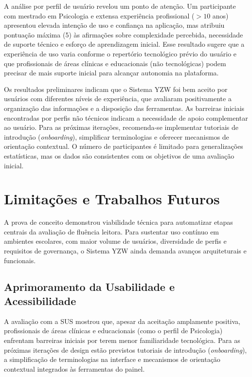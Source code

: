 \documentclass[12pt]{article}
\begin{document}
A análise por perfil de usuário revelou um ponto de atenção. Um participante com mestrado em Psicologia e extensa experiência profissional ($>10$ anos) apresentou elevada intenção de uso e confiança na aplicação, mas atribuiu pontuação máxima (5) às afirmações sobre complexidade percebida, necessidade de suporte técnico e esforço de aprendizagem inicial. Esse resultado sugere que a experiência de uso varia conforme o repertório tecnológico prévio do usuário e que profissionais de áreas clínicas e educacionais (não tecnológicas) podem precisar de mais suporte inicial para alcançar autonomia na plataforma.

Os resultados preliminares indicam que o Sistema YZW foi bem aceito por usuários com diferentes níveis de experiência, que avaliaram positivamente a organização das informações e a disposição das ferramentas. As barreiras iniciais encontradas por perfis não técnicos indicam a necessidade de apoio complementar ao usuário. Para as próximas iterações, recomenda-se implementar tutoriais de introdução (\textit{onboarding}), simplificar terminologias e oferecer mecanismos de orientação contextual. O número de participantes é limitado para generalizações estatísticas, mas os dados são consistentes com os objetivos de uma avaliação inicial.
\section{Limitações e Trabalhos Futuros}
\label{sec:proximos-passos}

A prova de conceito demonstrou viabilidade técnica para automatizar etapas centrais da avaliação de fluência leitora. Para sustentar uso contínuo em ambientes escolares, com maior volume de usuários, diversidade de perfis e requisitos de governança, o Sistema YZW ainda demanda avanços arquiteturais e funcionais.

\subsection{Aprimoramento da Usabilidade e Acessibilidade}
A avaliação com a SUS mostrou que, apesar da aceitação amplamente positiva, profissionais de áreas clínicas e educacionais (como o perfil de Psicologia) enfrentam barreiras iniciais por terem menor familiaridade tecnológica. Para as próximas iterações de design estão previstos tutoriais de introdução (\textit{onboarding}), a simplificação de terminologias na interface e mecanismos de orientação contextual integrados às ferramentas do painel.
\end{document}
